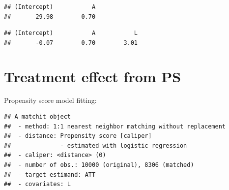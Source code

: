 \documentclass[
]{book}
\newenvironment{Shaded}{\begin{snugshade}}{\end{snugshade}}
\newcommand{\AttributeTok}[1]{\textcolor[rgb]{0.77,0.63,0.00}{#1}}
\newcommand{\ConstantTok}[1]{\textcolor[rgb]{0.00,0.00,0.00}{#1}}
\newcommand{\DecValTok}[1]{\textcolor[rgb]{0.00,0.00,0.81}{#1}}
\newcommand{\FloatTok}[1]{\textcolor[rgb]{0.00,0.00,0.81}{#1}}
\newcommand{\FunctionTok}[1]{\textcolor[rgb]{0.00,0.00,0.00}{#1}}
\newcommand{\NormalTok}[1]{#1}
\newcommand{\OtherTok}[1]{\textcolor[rgb]{0.56,0.35,0.01}{#1}}
\newcommand{\SpecialCharTok}[1]{\textcolor[rgb]{0.00,0.00,0.00}{#1}}
\newcommand{\StringTok}[1]{\textcolor[rgb]{0.31,0.60,0.02}{#1}}
\begin{document}
\begin{verbatim}
## (Intercept)           A 
##       29.98        0.70
\end{verbatim}

\begin{Shaded}
\end{Shaded}

\begin{verbatim}
## (Intercept)           A           L 
##       -0.07        0.70        3.01
\end{verbatim}

\hypertarget{treatment-effect-from-ps}{%
\section{Treatment effect from PS}\label{treatment-effect-from-ps}}

Propensity score model fitting:

\begin{Shaded}
\end{Shaded}

\begin{verbatim}
## A matchit object
##  - method: 1:1 nearest neighbor matching without replacement
##  - distance: Propensity score [caliper]
##              - estimated with logistic regression
##  - caliper: <distance> (0)
##  - number of obs.: 10000 (original), 8306 (matched)
##  - target estimand: ATT
##  - covariates: L
\end{verbatim}
\end{document}
